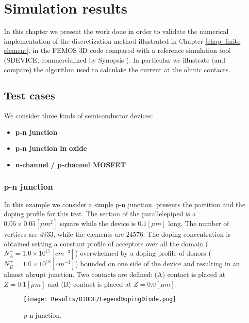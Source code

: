 \chapter{Simulation results}
\label{chap: results}

In this chapter we present the work done in order to validate the numerical implementation of the discretization method illustrated in Chapter \ref{chap: finite element}, in the FEMOS 3D code compared with a reference simulation tool (SDEVICE, commercialized by Synopsis \cite{SdeviceManual}).
In particular we illustrate (and compare) the algorithm used to calculate the current at the ohmic contacts.

\section{Test cases}

We consider three kinds of semiconductor devices: 

\begin{itemize}
\setlength{\itemsep}{0.5pt}
\item {\bf p-n junction}
\item {\bf p-n junction in oxide}
\item {\bf n-channel / p-channel MOSFET}
\end{itemize}

\subsection{p-n junction}
\label{sec: PN}

In this example we consider a simple p-n junction.  presents the partition and the doping profile for this test. The section of the parallelepiped is a $0.05 \times 0.05 [\mu m^2]$ square while the device is $0.1 [\mu m]$ long.  The number of vertices are $4933$, while the elements are $24576$.  The doping concentration is obtained setting a constant profile of acceptors over all the domain ($N_A^- = 1.0\times 10^{17} [cm^{-3}]$) overwhelmed by a doping profile of  donors ($N_D^+=1.0 \times 10^{18} [cm^{-3}]$) bounded on one side of the device and resulting in an almost abrupt junction. 
Two contacts are defined: (A) contact is placed at $Z=0.1[\mu m]$ and (B) contact is placed at $Z=0.0 [\mu m]$.  


\begin{figure}[!t]
\centering
{}
\hspace{0.06\textwidth}
\hspace{0.04\textwidth}
{\texttt{[image: Results/DIODE/LegendDopingDiode.png]}}
\caption{p-n junction.}
\label{fig: diodo struttura}
\end{figure}


